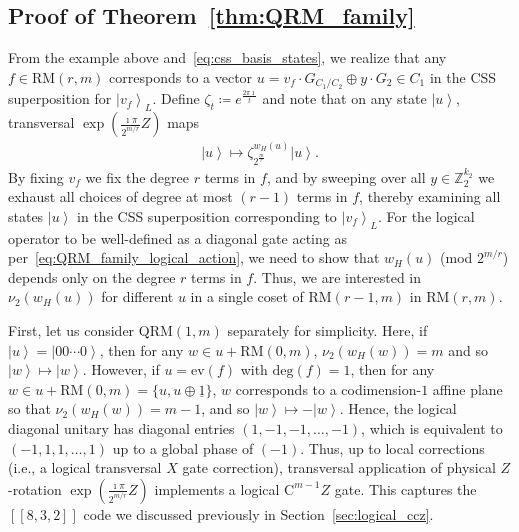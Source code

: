 \documentclass[twoside,romanappendices]{IEEEtran}
\newcommand{\ket}[1]{\left\lvert #1 \right\rangle}
\newcommand{\vecnot}[1]{\underline{#1}}
\newcommand{\llbr}{[\![}
\newcommand{\rrbr}{]\!]}
\begin{document}
\subsection{Proof of Theorem~\ref{thm:QRM_family}}
\label{sec:proof_QRM_family}



From the example above and~\eqref{eq:css_basis_states}, we realize that any $f \in \text{RM}(r,m)$ corresponds to a vector $u = v_f \cdot G_{C_1/C_2} \oplus y \cdot G_2 \in C_1$ in the CSS superposition for $\ket{v_f}_L$.
Define $\zeta_t \coloneqq e^{\frac{2\pi \imath}{t}}$ and note that on any state $\ket{u}$, transversal $\exp\left( \frac{\imath\pi}{2^{m/r}} Z \right)$ maps 
\begin{align}
\label{eq:u_zeta}
\ket{u} \mapsto \zeta_{2^{\frac{m}{r}}}^{w_H(u)} \ket{u}.
\end{align}
By fixing $v_f$ we fix the degree $r$ terms in $f$, and by sweeping over all $y \in \mathbb{Z}_2^{k_2}$ we exhaust all choices of degree at most $(r-1)$ terms in $f$, thereby examining all states $\ket{u}$ in the CSS superposition corresponding to $\ket{v_f}_L$.
For the logical operator to be well-defined as a diagonal gate acting as per~\eqref{eq:QRM_family_logical_action}, we need to show that $w_H(u)$ (mod $2^{m/r}$) depends only on the degree $r$ terms in $f$.
Thus, we are interested in $\nu_2(w_H(u))$ for different $u$ in a single coset of $\text{RM}(r-1,m)$ in $\text{RM}(r,m)$.

First, let us consider $\text{QRM}(1,m)$ separately for simplicity.  
Here, if $\ket{u} = \ket{00\cdots0}$, then for any $w \in u + \text{RM}(0,m)$, $\nu_2(w_H(w)) = m$ and so $\ket{w} \mapsto \ket{w}$.  
However, if $u = \text{ev}(f)$ with $\text{deg}(f) = 1$, then for any $w \in u + \text{RM}(0,m) = \{ u, u \oplus \vecnot{1} \}$, $w$ corresponds to a codimension-$1$ affine plane so that $\nu_2(w_H(w)) = m-1$, and so $\ket{w} \mapsto -\ket{w}$.
Hence, the logical diagonal unitary has diagonal entries $(1,-1,-1,\ldots,-1)$, which is equivalent to $(-1,1,1,\ldots,1)$ up to a global phase of $(-1)$.
Thus, up to local corrections (i.e., a logical transversal $X$ gate correction), transversal application of physical $Z$-rotation $\exp\left( \frac{\imath\pi}{2^{m/r}} Z \right)$ implements a logical $\text{C}^{m-1}Z$ gate.
This captures the $\llbr 8,3,2 \rrbr$ code we discussed previously in Section~\ref{sec:logical_ccz}.
\end{document}
